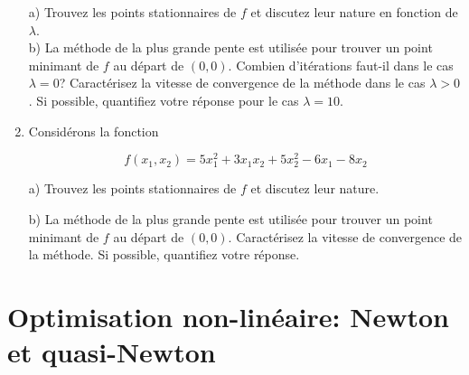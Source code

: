\begin{enumerate}
    a) Trouvez les points stationnaires de $f$ et discutez leur nature en fonction de $\lambda$.\\

    b) La méthode de la plus grande pente est utilisée pour trouver un point minimant de $f$ au départ de $(0, 0)$.
    Combien d'itérations faut-il dans le cas $\lambda = 0$? Caractérisez la vitesse de convergence de la
    méthode dans le cas $\lambda >0$. Si possible, quantifiez votre réponse pour le cas  $\lambda =10$.

    \begin{solution}
    \end{solution}

  \item  Consid\'erons la fonction

    $$f(x_1,x_2) = 5 x_1^2 + 3 x_1 x_2 + 5 x_2^2 - 6 x_1 -8 x_2$$




    a) Trouvez les points stationnaires de $f$ et discutez leur nature.

    b) La m\'ethode de la plus grande pente est utilis\'ee pour trouver un point
    minimant de $f$ au d\'epart de $(0, 0)$.
    Caract\'erisez la vitesse de convergence de la
    m\'ethode. Si possible, quantifiez votre r\'eponse.



\end{enumerate}

\newpage


\section{Optimisation non-linéaire: Newton et quasi-Newton}

